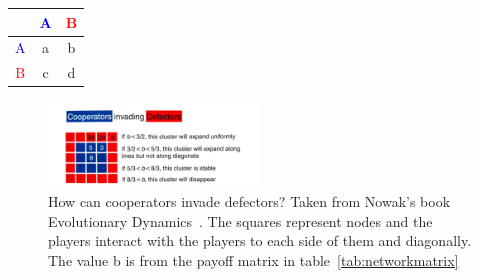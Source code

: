 \documentclass[]{final_report}
\begin{document}
\begin{framed}
	\begin{center}
		\begin{tabular}{c|cc}
		& \textcolor{blue}{A} & \textcolor{red}{B}\\	
		\hline
		\textcolor{blue}{A} & a & b\\
		\textcolor{red}{B} & c & d\\
		\end{tabular}
		\label{tab:networkmatrix}
	\end{center}	
\end{framed}
\begin{figure}
	\center
	\includegraphics[width=0.5\textwidth]{cooperators-invading-defectors.jpg}
	\caption{How can cooperators invade defectors? Taken from Nowak's book Evolutionary Dynamics~\cite{nowak2006evolutionary}. The squares represent nodes and the players interact with the players to each side of them and diagonally. The value b is from the payoff matrix in table~\ref{tab:networkmatrix}}
	\label{fig:coopinvdef}
\end{figure}
\end{document}

